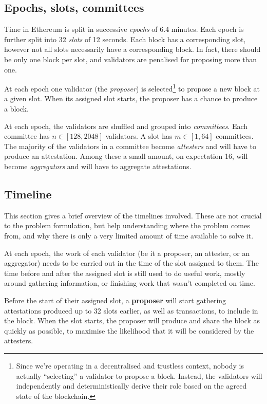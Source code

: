 \documentclass{article}
\begin{document}
\subsection{Epochs, slots, committees}

Time in Ethereum is split in successive \emph{epochs} of 6.4 minutes.  Each
epoch is further split into 32 \emph{slots} of 12 seconds. Each block has a
corresponding slot, however not all slots necessarily have a corresponding
block. In fact, there should be only one block per slot, and validators are
penalised for proposing more than one.

At each epoch one validator (the \emph{proposer}) is selected\footnote{Since
we're operating in a decentralised and trustless context, nobody is actually
``selecting'' a validator to propose a block. Instead, the validators will
independently and deterministically derive their role based on the agreed state
of the blockchain.} to propose a new block at a given slot. When its assigned
slot starts, the proposer has a chance to produce a block.

At each epoch, the validators are shuffled and grouped into \emph{committees}.
Each committee has $n \in \left[128, 2048\right]$ validators. A slot has $m \in
\left[1, 64\right]$ committees. The majority of the validators in a committee
become \emph{attesters} and will have to produce an attestation. Among these a
small amount, on expectation 16, will become \emph{aggregators} and will have
to aggregate attestations. 

\subsection{Timeline}

This section gives a brief overview of the timelines involved. These are not
crucial to the problem formulation, but help understanding where the problem
comes from, and why there is only a very limited amount of time available to
solve it.

At each epoch, the work of each validator (be it a proposer, an attester, or an
aggregator) needs to be carried out in the time of the slot assigned to them.
The time before and after the assigned slot is still used to do useful work,
mostly around gathering information, or finishing work that wasn't completed on
time.

Before the start of their assigned slot, a \textbf{proposer} will start
gathering attestations produced up to 32 slots earlier, as well as
transactions, to include in the block. When the slot starts, the proposer will
produce and share the block as quickly as possible, to maximise the likelihood
that it will be considered by the attesters.
\end{document}
